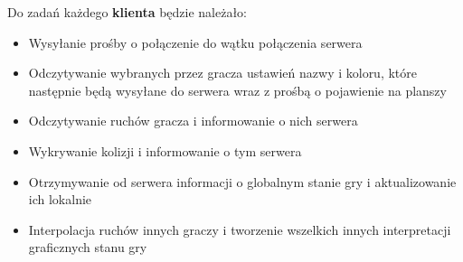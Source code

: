 \documentclass{article}
\begin{document}
Do zadań każdego \textbf{klienta} będzie należało:

\begin{itemize}
    \item Wysyłanie prośby o połączenie do wątku połączenia serwera
    \item Odczytywanie wybranych przez gracza ustawień nazwy i koloru, które następnie będą wysyłane do serwera wraz z prośbą o pojawienie na planszy
    \item Odczytywanie ruchów gracza i informowanie o nich serwera
    \item Wykrywanie kolizji i informowanie o tym serwera
    \item Otrzymywanie od serwera informacji o globalnym stanie gry i aktualizowanie ich lokalnie
    \item Interpolacja ruchów innych graczy i tworzenie wszelkich innych interpretacji graficznych stanu gry
\end{itemize}
\end{document}
